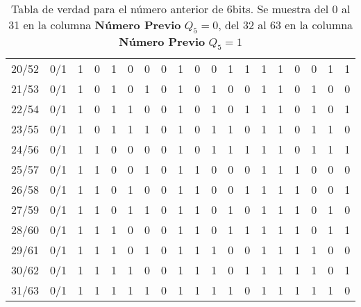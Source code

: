 \begin{table}[H]
\begin{adjustbox}{max width=\textwidth}
\begin{tabular}{ c | c | c | c | c | c | c ||| c | c | c | c | c | c || c | c | c | c | c | c }
      20/52 & 0/1 & 1 & 0 & 1 & 0 & 0 &   0 & 1 & 0 & 0 & 1 & 1 &   1 & 1 & 0 & 0 & 1 & 1 \\
      21/53 & 0/1 & 1 & 0 & 1 & 0 & 1 &   0 & 1 & 0 & 1 & 0 & 0 &   1 & 1 & 0 & 1 & 0 & 0 \\
      22/54 & 0/1 & 1 & 0 & 1 & 1 & 0 &   0 & 1 & 0 & 1 & 0 & 1 &   1 & 1 & 0 & 1 & 0 & 1 \\
      23/55 & 0/1 & 1 & 0 & 1 & 1 & 1 &   0 & 1 & 0 & 1 & 1 & 0 &   1 & 1 & 0 & 1 & 1 & 0 \\ \hline
      24/56 & 0/1 & 1 & 1 & 0 & 0 & 0 &   0 & 1 & 0 & 1 & 1 & 1 &   1 & 1 & 0 & 1 & 1 & 1 \\
      25/57 & 0/1 & 1 & 1 & 0 & 0 & 1 &   0 & 1 & 1 & 0 & 0 & 0 &   1 & 1 & 1 & 0 & 0 & 0 \\
      26/58 & 0/1 & 1 & 1 & 0 & 1 & 0 &   0 & 1 & 1 & 0 & 0 & 1 &   1 & 1 & 1 & 0 & 0 & 1 \\
      27/59 & 0/1 & 1 & 1 & 0 & 1 & 1 &   0 & 1 & 1 & 0 & 1 & 0 &   1 & 1 & 1 & 0 & 1 & 0 \\ \hline
      28/60 & 0/1 & 1 & 1 & 1 & 0 & 0 &   0 & 1 & 1 & 0 & 1 & 1 &   1 & 1 & 1 & 0 & 1 & 1 \\
      29/61 & 0/1 & 1 & 1 & 1 & 0 & 1 &   0 & 1 & 1 & 1 & 0 & 0 &   1 & 1 & 1 & 1 & 0 & 0 \\
      30/62 & 0/1 & 1 & 1 & 1 & 1 & 0 &   0 & 1 & 1 & 1 & 0 & 1 &   1 & 1 & 1 & 1 & 0 & 1 \\
      31/63 & 0/1 & 1 & 1 & 1 & 1 & 1 &   0 & 1 & 1 & 1 & 1 & 0 &   1 & 1 & 1 & 1 & 1 & 0 \\ \bottomrule
    \end{tabular}
  \end{adjustbox}
  \caption{Tabla de verdad para el número anterior de 6bits. Se muestra del 0 al
  31 en la columna \textbf{Número Previo} \small{$Q_5=0$}, del 32 al 63 en la
  columna \textbf{Número Previo} \small{$Q_5=1$}}
\end{table}
